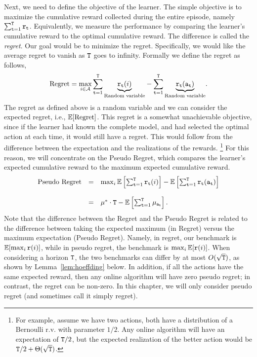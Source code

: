 Next, we need to define the objective of the learner. The simple objective is to maximize the cumulative reward collected during the entire episode, namely $\sum_{{\tt t}=1}^{\tt T} {\tt r}_{\tt t}$. Equivalently, we measure the performance by comparing the learner's cumulative reward to the optimal cumulative reward. The difference is called the \emph{regret}. Our goal would be to minimize the regret. Specifically, we would like the average regret to vanish as ${\tt T}$ goes to infinity.
Formally we define the regret as follows,
\[
\text{Regret}=\max_{i\in \mathcal{A}}{\displaystyle
\sum_{{\tt t}=1}^{{\tt T}}\underbrace{{\tt r}_{{\tt t}}(i)}_{\text{Random variable}}}-{\displaystyle
\sum_{{\tt t}=1}^{{\tt T}}\underbrace{{\tt r}_{{\tt t}}({\tt a}_{{\tt t}})}_{\text{Random variable}}}.
\]
The regret as defined above is a random variable and we can consider the expected regret, i.e., $\mathbb{E}[\text{Regret}]$. This regret is a somewhat unachievable objective, since if the learner had known the complete model, and  had selected the optimal action at each time, it would still have a regret. This would follow from the difference between the expectation and the realizations of the rewards. \footnote{For example, assume we have two actions, both have a distribution of a Bernoulli r.v. with parameter $1/2$. Any online algorithm will have an expectation of ${\tt T}/2$, but the expected realization of the better action would be ${\tt T}/2+\Theta(\sqrt{{\tt T}})$.}
For this reason, we will concentrate on the Pseudo Regret, which compares the learner's expected cumulative reward to the maximum expected cumulative reward. 
\[
\begin{array}{ccl}
\text{Pseudo Regret} & = & \max_{i}\mathbb{E}\left[ \sum_{{\tt t}= 1}^{{\tt T}}{\tt r}_{{\tt t}}(i)\right]-\mathbb{E}\left[ \sum_{{\tt t}=1}^{{\tt T}}{\tt r}_{{\tt t}}({\tt a}_{{\tt t}})\right]\\
\\
 & = & \mu^{*}\cdot {\tt T}- \mathbb{E}\left[\sum_{{\tt t}=1}^{{\tt T}}\mu_{{\tt a}_{{\tt t}}}\right].
\end{array}
\]
Note that the difference between the Regret and the Pseudo Regret is related to the difference between taking the expected maximum (in Regret) versus the maximum expectation (Pseudo Regret). Namely, in regret, our benchmark is $\mathbb{E}[\max_i {\tt r}(i)]$, while in pseudo regret, the benchmark is $\max_i \mathbb{E}[{\tt r}(i)]$. When considering a horizon ${\tt T}$, the two benchmarks can differ by at most $O(\sqrt{{\tt T}})$, as shown by Lemma~\ref{lem:hoeffding} below.
%
In addition, if all the actions have the same expected reward, then any online algorithm will have zero pseudo regret; in contrast, the regret can be non-zero.
%
In this chapter, we will only consider pseudo regret (and sometimes call it simply regret). 

